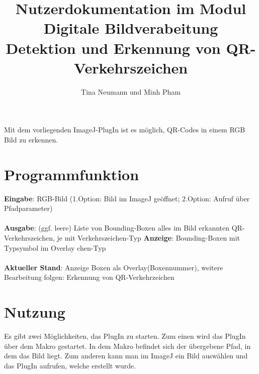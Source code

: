 \documentclass[a4paper,11pt,parskip]{article}
\begin{document}
\title{Nutzerdokumentation im Modul Digitale Bildverabeitung\\  
\textbf{Detektion und Erkennung von QR-Verkehrszeichen}}
\author{Tina Neumann und Minh Pham}

\maketitle

Mit dem vorliegenden ImageJ-PlugIn ist es möglich, QR-Codes in einem RGB Bild zu erkennen.\\

\section{Programmfunktion}

\textbf{Eingabe}: RGB-Bild (1.Option: Bild im ImageJ geöffnet; 2.Option: Aufruf über Pfadparameter)\\ \\
\textbf{Ausgabe}: (ggf. leere) Liste von Bounding-Boxen alles im Bild erkannten QR-Verkehrszeichen, je mit Verkehrszeichen-Typ
\textbf{Anzeige}: Bounding-Boxen mit Typsymbol im Overlay
chen-Typ\\ \\
\textbf{Aktueller Stand}: Anzeige Boxen als Overlay(Boxennummer), weitere Bearbeitung folgen: Erkennung von QR-Verkehrzeichen

\section{Nutzung}
Es gibt zwei Möglichkeiten, das PlugIn zu starten. Zum einen wird das PlugIn über dem Makro gestartet. In dem Makro befindet sich der übergebene Pfad, in dem das Bild liegt. Zum anderen kann man im ImageJ ein Bild auswählen und das PlugIn aufrufen, welche erstellt wurde.
\end{document}
